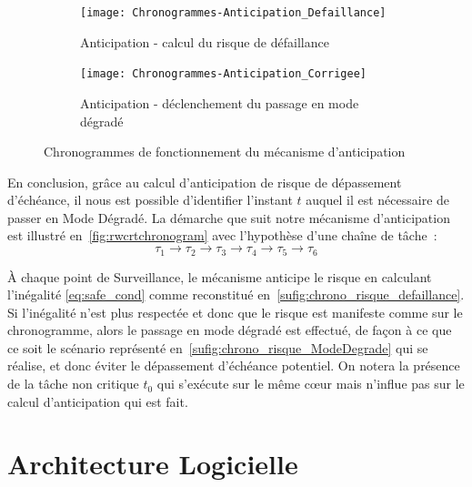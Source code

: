\documentclass[french, a4paper, 11pt, twoside, pdftex]{StyleThese}
\begin{document}
	\begin{figure}[ht]
		\centering
		\begin{subfigure}{0.7\textwidth} \centering
			\texttt{[image: Chronogrammes-Anticipation\_Defaillance]}
			\caption[Anticipation - risque de défaillance]{Anticipation - calcul du risque de défaillance}
			\label{sufig:chrono_risque_defaillance}
		\end{subfigure}
		\begin{subfigure}{0.7\textwidth} \centering
			\texttt{[image: Chronogrammes-Anticipation\_Corrigee]}
			\caption[Anticipation - passage en mode dégradé]{Anticipation - déclenchement du passage en mode dégradé}
			\label{sufig:chrono_risque_ModeDegrade}
		\end{subfigure}
		\caption{Chronogrammes de fonctionnement du mécanisme d'anticipation}
		\label{fig:rwcrtchronogram}
	\end{figure}

    En conclusion, grâce au calcul d'anticipation de risque de dépassement d'échéance, il nous est possible d'identifier l'instant $t$ auquel il est nécessaire de passer en Mode Dégradé. La démarche que suit notre mécanisme d'anticipation est illustré en~\autoref{fig:rwcrtchronogram} avec l'hypothèse d'une chaîne de tâche~:
    \[  \tau_{1} \rightarrow \tau_{2} \rightarrow \tau_{3} \rightarrow \tau_{4} \rightarrow \tau_{5} \rightarrow \tau_{6} \] 
     
     À chaque point de Surveillance, le mécanisme anticipe le risque en calculant l'inégalité \ref{eq:safe_cond} comme reconstitué en~\autoref{sufig:chrono_risque_defaillance}. Si l'inégalité n'est plus respectée et donc que le risque est manifeste comme sur le chronogramme, alors le passage en mode dégradé est effectué, de façon à ce que ce soit le scénario représenté en~\autoref{sufig:chrono_risque_ModeDegrade} qui se réalise, et donc éviter le dépassement d'échéance potentiel. On notera la présence de la tâche non critique $t_0$ qui s'exécute sur le même cœur mais n'influe pas sur le calcul d'anticipation qui est fait.
	
	\section{Architecture Logicielle}
	
\end{document}

